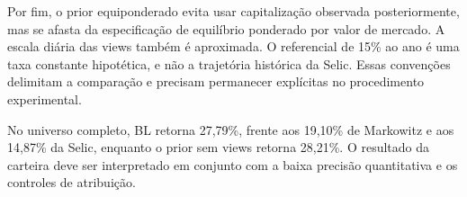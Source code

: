 Por fim, o prior equiponderado evita usar capitalização observada posteriormente, mas se afasta da especificação de equilíbrio ponderado por valor de mercado. A escala diária das views também é aproximada. O referencial de 15\% ao ano é uma taxa constante hipotética, e não a trajetória histórica da Selic. Essas convenções delimitam a comparação e precisam permanecer explícitas no procedimento experimental.

No universo completo, BL retorna 27,79\%, frente aos 19,10\% de Markowitz e aos 14,87\% da Selic, enquanto o prior sem views retorna 28,21\%. O resultado da carteira deve ser interpretado em conjunto com a baixa precisão quantitativa e os controles de atribuição.
